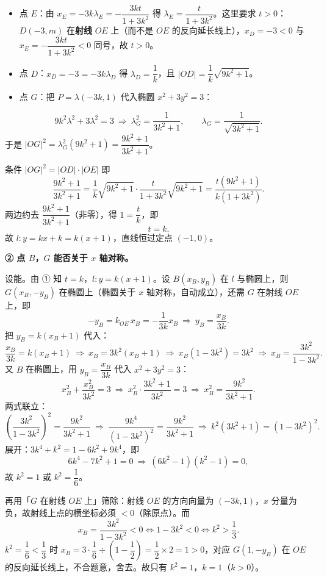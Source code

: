 \begin{answer}
\begin{itemize}
\item 点 $E$：由 $x_E=-3k\lambda_E=-\dfrac{3kt}{1+3k^2}$ 得 $\lambda_E=\dfrac{t}{1+3k^2}$。这里要求 $t>0$：$D(-3,m)$ 在\textbf{射线} $OE$ 上（而不是 $OE$ 的反向延长线上），$x_D=-3<0$ 与 $x_E=-\dfrac{3kt}{1+3k^2}<0$ 同号，故 $t>0$。
\item 点 $D$：$x_D=-3=-3k\lambda_D$ 得 $\lambda_D=\dfrac1k$，且 $|OD|=\dfrac1k\sqrt{9k^2+1}$。
\item 点 $G$：把 $P=\lambda(-3k,1)$ 代入椭圆 $x^2+3y^2=3$：
\end{itemize}
\nopagebreak[4]
\[
9k^2\lambda^2+3\lambda^2=3\ \Longrightarrow\ \lambda_G^2=\frac{1}{3k^2+1},\qquad
\lambda_G=\frac{1}{\sqrt{3k^2+1}}.
\]
于是 $|OG|^2=\lambda_G^2(9k^2+1)=\dfrac{9k^2+1}{3k^2+1}$。

条件 $|OG|^2=|OD|\cdot|OE|$ 即
\nopagebreak[4]
\[
\frac{9k^2+1}{3k^2+1}=\frac{1}{k}\sqrt{9k^2+1}\cdot\frac{t}{1+3k^2}\sqrt{9k^2+1}
=\frac{t(9k^2+1)}{k(1+3k^2)}.
\]
两边约去 $\dfrac{9k^2+1}{3k^2+1}$（非零），得 $1=\dfrac tk$，即
\nopagebreak[4]
\[
t=k.
\]
故 $l:y=kx+k=k(x+1)$，直线恒过定点 $(-1,0)$。

\textbf{② 点 $B$，$G$ 能否关于 $x$ 轴对称。}

设能。由 ① 知 $t=k$，$l:y=k(x+1)$。设 $B(x_B,y_B)$ 在 $l$ 与椭圆上，则 $G(x_B,-y_B)$ 在椭圆上（椭圆关于 $x$ 轴对称，自动成立），还需 $G$ 在射线 $OE$ 上，即
\nopagebreak[4]
\[
-y_B=k_{OE}\,x_B=-\frac{1}{3k}x_B\ \Longrightarrow\ y_B=\frac{x_B}{3k}.
\]
把 $y_B=k(x_B+1)$ 代入：
\nopagebreak[4]
\[
\frac{x_B}{3k}=k(x_B+1)\ \Longrightarrow\ x_B=3k^2(x_B+1)\ \Longrightarrow\ x_B\left(1-3k^2\right)=3k^2\ \Longrightarrow\ x_B=\frac{3k^2}{1-3k^2}.
\]
又 $B$ 在椭圆上，用 $y_B=\dfrac{x_B}{3k}$ 代入 $x^2+3y^2=3$：
\nopagebreak[4]
\[
x_B^2+\frac{x_B^2}{3k^2}=3\ \Longrightarrow\ x_B^2\cdot\frac{3k^2+1}{3k^2}=3\ \Longrightarrow\ x_B^2=\frac{9k^2}{3k^2+1}.
\]
两式联立：
\nopagebreak[4]
\[
\left(\frac{3k^2}{1-3k^2}\right)^2=\frac{9k^2}{3k^2+1}
\ \Longrightarrow\ \frac{9k^4}{(1-3k^2)^2}=\frac{9k^2}{3k^2+1}
\ \Longrightarrow\ k^2(3k^2+1)=(1-3k^2)^2.
\]
展开：$3k^4+k^2=1-6k^2+9k^4$，即
\nopagebreak[4]
\[
6k^4-7k^2+1=0\ \Longrightarrow\ (6k^2-1)(k^2-1)=0,
\]
故 $k^2=1$ 或 $k^2=\dfrac16$。

再用「$G$ 在射线 $OE$ 上」筛除：射线 $OE$ 的方向向量为 $(-3k,1)$，$x$ 分量为负，故射线上点的横坐标必须 $<0$（除原点）。而
\nopagebreak[4]
\[
x_B=\frac{3k^2}{1-3k^2}<0\iff 1-3k^2<0\iff k^2>\frac13.
\]
$k^2=\dfrac16<\dfrac13$ 时 $x_B=3\cdot\dfrac16\div\left(1-\dfrac12\right)=\dfrac12\times2=1>0$，对应 $G(1,-y_B)$ 在 $OE$ 的反向延长线上，不合题意，舍去。故只有 $k^2=1$，$k=1$（$k>0$）。


\end{answer}
